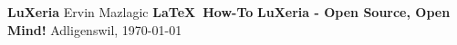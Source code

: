 
\begin{titlepage}
\begin{center}
\vfill{\textbf{LuXeria}}
\vfill{\small Ervin Mazlagic}
\vfill{}
\vfill{}
\vfill{}
\vfill{}
\vfill{}
\vfill{\Huge \textbf{\LaTeX~How-To}}
\vfill{}
\vfill{}
\vfill{}
\vfill{}
\vfill{}
\vfill{\textbf{LuXeria - Open Source, Open Mind!}}
\vfill{Adligenswil, \today}
\end{center}
\end{titlepage}
